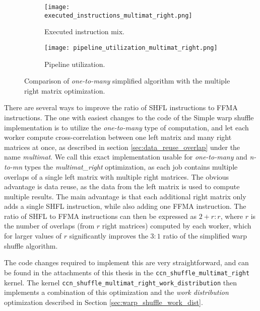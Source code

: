 \begin{figure}[ht]
	\centering	
	\begin{subfigure}{\textwidth}
		\centering
		\texttt{[image: executed\_instructions\_multimat\_right.png]}
		\caption{Executed instruction mix.}
		\label{fig:executed_instructions_multimat_right}
	\end{subfigure}
	\hfill
	\begin{subfigure}{\textwidth}
		\centering
		\texttt{[image: pipeline\_utilization\_multimat\_right.png]}
		\caption{Pipeline utilization.}
		\label{fig:pipeline_utilization_multimat_right}
	\end{subfigure}
	
	\caption{Comparison of \textit{one-to-many} simplified algorithm with the multiple right matrix optimization.}
	\label{fig:multimat_right_profiling}
\end{figure}

There are several ways to improve the ratio of SHFL instructions to FFMA instructions. The one with easiest changes to the code of the Simple warp shuffle implementation is to utilize the \textit{one-to-many} type of computation, and let each worker compute cross-correlation between one left matrix and many right matrices at once, as described in section \ref{sec:data_reuse_overlap} under the name \textit{multimat}. We call this exact implementation usable for \textit{one-to-many} and \textit{n-to-mn} types the \textit{multimat\_right} optimization, as each job contains multiple overlaps of a single left matrix with multiple right matrices. The obvious advantage is data reuse, as the data from the left matrix is used to compute multiple results. The main advantage is that each additional right matrix only adds a single SHFL instruction, while also adding one FFMA instruction. The ratio of SHFL to FFMA instructions can then be expressed as $2 + r : r$, where $r$ is the number of overlaps (from $r$ right matrices) computed by each worker, which for larger values of $r$ significantly improves the $3:1$ ratio of the simplified warp shuffle algorithm.


The code changes required to implement this are very straightforward, and can be found in the attachments of this thesis in the \texttt{ccn\_shuffle\_multimat\_right} kernel. The kernel \texttt{ccn\_shuffle\_multimat\_right\_work\_distribution} then implements a combination of this optimization and the \textit{work distribution} optimization described in Section \ref{sec:warp_shuffle_work_dist}.

